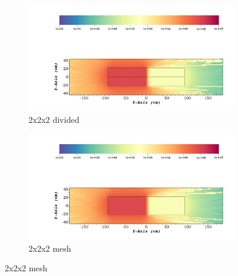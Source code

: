 \begin{figure}
	\begin{subfigure}[t]{0.5\textwidth}
		\includegraphics[width=\linewidth, trim={5cm 1cm 2cm 16cm},clip]{../figs/toy_p1/dose_VPI_2x_split.png}
		\caption{2x2x2 divided}
		\label{fig:1dose_2x_split}
	\end{subfigure}\hfill
	\begin{subfigure}[t]{0.5\textwidth}
		\includegraphics[width=\linewidth, trim={5cm 1cm 2cm 16cm},clip]{../figs/toy_p1/dose_VPI_2x_mesh.png}
		\caption{2x2x2 mesh}
		\label{fig:1dose_2x_mesh}
	\end{subfigure}


\end{figure}
